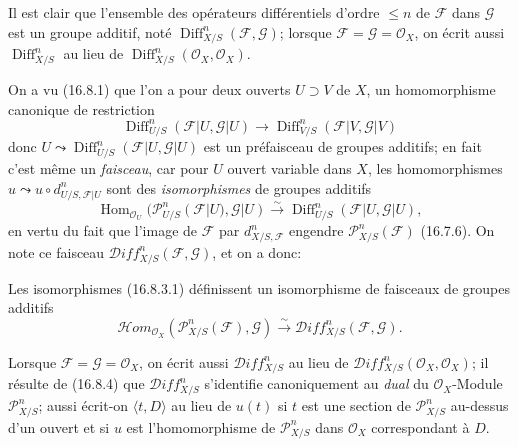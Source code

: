 \begin{env}[16.8.3]
\label{IV.16.8.3}
Il est clair que l'ensemble des opérateurs différentiels d'ordre $\leq n$ de
$\mathscr{F}$ dans $\mathscr{G}$ est un groupe additif, noté
$\operatorname{Diff}_{X/S}^n(\mathscr{F},\mathscr{G})$; lorsque
$\mathscr{F}=\mathscr{G}=\mathcal{O}_X$, on écrit aussi
$\operatorname{Diff}_{X/S}^n$ au lieu de
$\operatorname{Diff}_{X/S}^n(\mathcal{O}_X,\mathcal{O}_X)$.

On a vu (16.8.1) que l'on a pour deux ouverts $U\supset V$ de $X$, un
homomorphisme canonique de restriction
\[
  \operatorname{Diff}_{U/S}^n(\mathscr{F}|U,\mathscr{G}|U)
  \longrightarrow
  \operatorname{Diff}_{V/S}^n(\mathscr{F}|V,\mathscr{G}|V)
\]
donc $U\leadsto\operatorname{Diff}_{U/S}^n(\mathscr{F}|U,\mathscr{G}|U)$ est
un préfaisceau de groupes additifs; en fait c'est même un \emph{faisceau}, car
pour $U$ ouvert variable dans $X$, les homomorphismes
$u\leadsto u\circ d_{U/S,\mathscr{F}|U}^n$ sont des \emph{isomorphismes} de
groupes additifs
\[
  \operatorname{Hom}_{\mathcal{O}_U}
  (\mathscr{P}_{U/S}^n(\mathscr{F}|U),\mathscr{G}|U)
  \xrightarrow{\sim}
  \operatorname{Diff}_{U/S}^n(\mathscr{F}|U,\mathscr{G}|U),
  \tag{16.8.3.1}
  \label{IV.16.8.3.1}
\]
en vertu du fait que l'image de $\mathscr{F}$ par
$d_{X/S,\mathscr{F}}^n$ engendre $\mathscr{P}_{X/S}^n(\mathscr{F})$
(16.7.6). On note ce faisceau
$\mathscr{D}\!iff_{X/S}^n(\mathscr{F},\mathscr{G})$, et on a donc:
\end{env}

\begin{proposition}[16.8.4]
\label{IV.16.8.4}
Les isomorphismes \textup{(16.8.3.1)} définissent un isomorphisme de faisceaux de
groupes additifs
\[
  \mathscr{H}\!om_{\mathcal{O}_X}
  (\mathscr{P}_{X/S}^n(\mathscr{F}),\mathscr{G})
  \xrightarrow{\sim}
  \mathscr{D}\!iff_{X/S}^n(\mathscr{F},\mathscr{G}).
  \tag{16.8.4.1}
  \label{IV.16.8.4.1}
\]
\end{proposition}

Lorsque $\mathscr{F}=\mathscr{G}=\mathcal{O}_X$, on écrit aussi
$\mathscr{D}\!iff_{X/S}^n$ au lieu de
$\mathscr{D}\!iff_{X/S}^n(\mathcal{O}_X,\mathcal{O}_X)$; il résulte de
(16.8.4) que $\mathscr{D}\!iff_{X/S}^n$ s'identifie canoniquement au
\emph{dual} du $\mathcal{O}_X$-Module $\mathscr{P}_{X/S}^n$; aussi écrit-on
$\langle t,D\rangle$ au lieu de $u(t)$ si $t$ est une section de
$\mathscr{P}_{X/S}^n$ au-dessus d'un ouvert et si $u$ est l'homomorphisme de
$\mathscr{P}_{X/S}^n$ dans $\mathcal{O}_X$ correspondant à $D$.

